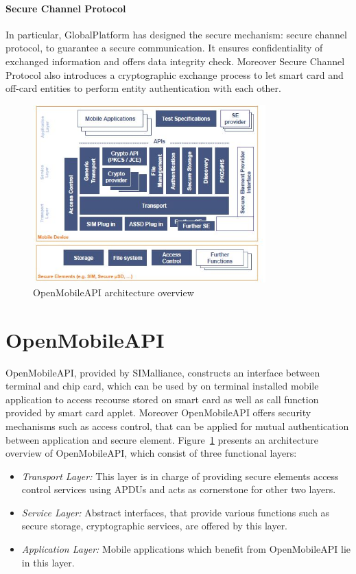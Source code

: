 \paragraph{Secure Channel Protocol}
In particular, GlobalPlatform has designed the secure mechanism: secure channel protocol, to guarantee a secure communication. It ensures confidentiality of exchanged information and offers data integrity check.  Moreover Secure Channel Protocol also introduces  a cryptographic exchange process to let smart card and off-card entities to perform entity authentication with each other. 
 \begin{figure}[!htbp]
	\centering
	\includegraphics[width=0.8\textwidth]{open-architecture.jpg}
		\caption{OpenMobileAPI architecture overview\cite{open}}
	\label{fig:open-architecture}
\end{figure}

\section{OpenMobileAPI}
OpenMobileAPI, provided by SIMalliance, constructs an interface between terminal and chip card, which can be used by on terminal installed mobile application to access recourse stored on smart card as well as call function provided by smart card applet. Moreover OpenMobileAPI offers security mechanisms such as access control, that can be applied for mutual authentication between application and secure element. Figure~\ref{fig:open-architecture} presents an architecture overview of OpenMobileAPI, which consist of three functional layers:
 \begin{itemize}
  \item \emph{Transport Layer:} This layer is in charge of providing secure elements access control services using APDUs and acts as cornerstone for other two layers.
  \item \emph{Service Layer:} Abstract interfaces, that provide various functions such as secure storage, cryptographic services, are offered by this layer.
  \item \emph{Application Layer:} Mobile applications which benefit from OpenMobileAPI lie in this layer.
\end{itemize}

